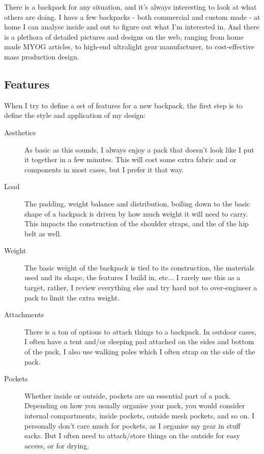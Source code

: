There is a backpack for any situation, and it's always interesting to look at what others are doing. I have a few backpacks - both commercial and custom made - at home I can analyse inside and out to figure out what I'm interested in. And there is a plethora of detailed pictures and designs on the web, ranging from home made MYOG articles, to high-end ultralight gear manufacturer, to cost-effective mass production design.

\subsection{Features}

When I try to define a set of features for a new backpack, the first step is to define the style and application of my design:

\begin{description}

  \item [Aesthetics] As basic as this sounds, I always enjoy a pack that doesn't look like I put it together in a few minutes. This will cost some extra fabric and or components in most cases, but I prefer it that way.

  \item [Load] The padding, weight balance and distribution, boiling down to the basic shape of a backpack is driven by how much weight it will need to carry. This impacts the construction of the shoulder straps, and the of the hip belt as well.

  \item [Weight] The basic weight of the backpack is tied to its construction, the materials used and its shape, the features I build in, etc... I rarely use this as a target, rather, I review everything else and try hard not to over-engineer a pack to limit the extra weight.

  \item [Attachments] There is a ton of options to attach things to a backpack. In outdoor cases, I often have a tent and/or sleeping pad attached on the sides and bottom of the pack, I also use walking poles which I often strap on the side of the pack.

  \item [Pockets] Whether inside or outside, pockets are an essential part of a pack. Depending on how you usually organise your pack, you would consider internal compartments, inside pockets, outside mesh pockets, and so on. I personally don't care much for pockets, as I organise my gear in stuff sacks. But I often need to attach/store things on the outside for easy access, or for drying.


\end{description}
